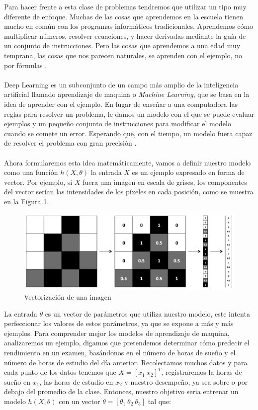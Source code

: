     Para hacer frente a esta clase de problemas tendremos que utilizar un tipo muy diferente de enfoque. Muchas de las cosas que aprendemos en la escuela tienen mucho en común con los programas informáticos tradicionales. Aprendemos cómo multiplicar números, resolver ecuaciones, y hacer derivadas mediante la guía de un conjunto de instrucciones. Pero las cosas que aprendemos a una edad muy temprana, las cosas que nos parecen naturales, se aprenden con el ejemplo, no por fórmulas \cite{dlBook}.
    \\\\
    Deep Learning es un subconjunto de un campo más amplio de la inteligencia artificial llamado aprendizaje de maquina o \textit{Machine Learning}, que se basa en la idea de aprender con el ejemplo. En lugar de enseñar a una computadora las reglas para resolver un problema, le damos un modelo con el que se puede evaluar ejemplos y un pequeño conjunto de instrucciones para modificar el modelo cuando se comete un error. Esperando que, con el tiempo, un modelo fuera capaz de resolver el problema con gran precisión \cite{dlBook}.
    \\\\
    Ahora formularemos esta idea matemáticamente, vamos a definir nuestro modelo como una función $h(X,\theta)$ la entrada $X$ es un ejemplo expresado en forma de vector. Por ejemplo, si $X$ fuera una imagen en escala de grises, los componentes del vector serían las intensidades de los píxeles en cada posición, como se muestra en la Figura \ref{fig:gscale}.
    \begin{figure}[htp]
        \centering
        \includegraphics[scale=0.4]{chapter3/grayscale.png}
        \caption{Vectorización de una imagen}
        \label{fig:gscale}
    \end{figure}

    La entrada $\theta$ es un vector de parámetros que utiliza nuestro modelo, este intenta perfeccionar los valores de estos parámetros, ya que se expone a más y más ejemplos. Para comprender mejor los modelos de aprendizaje de maquina, analizaremos un ejemplo, digamos que pretendemos determinar cómo predecir el rendimiento en un examen, basándonos en el número de horas de sueño y el número de horas de estudio del día anterior. Recolectamos muchos datos y para cada punto de los datos tenemos que $X=[x_1\ x_2]^T$, registraremos la horas de sueño en $x_1$, las horas de estudio en $x_2$ y nuestro desempeño, ya sea sobre o por debajo del promedio de la clase. Entonces, nuestro objetivo seria entrenar un modelo $h(X,\theta)$ con un vector $\theta=[\theta_1\ \theta_2\ \theta_3]$ tal que:

